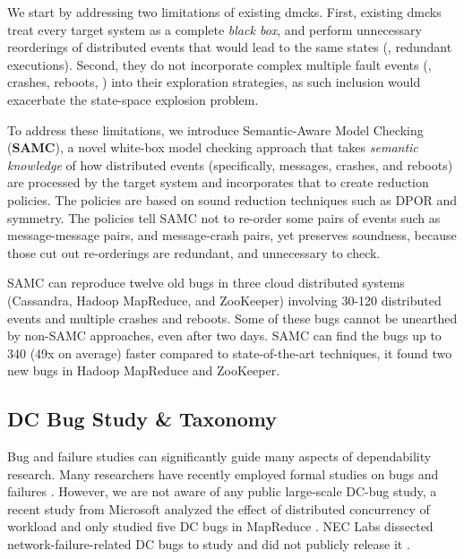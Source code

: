 We start by addressing two limitations of existing dmcks. First, existing dmcks
treat every target system as a complete \textit{black box}, and perform
unnecessary reorderings of distributed events that would lead to the same states
(\ie, redundant executions). Second, they do not incorporate complex multiple
fault events (\eg, crashes, reboots, \etc) into their exploration strategies, as
such inclusion would exacerbate the state-space explosion problem.

To address these limitations, we introduce Semantic-Aware Model Checking
(\textbf{SAMC}), a novel white-box model checking approach that takes
\textit{semantic knowledge} of how distributed events (specifically, messages,
crashes, and reboots) are processed by the target system and incorporates that
to create reduction policies. The policies are based on sound reduction
techniques such as DPOR and symmetry. The policies tell SAMC not to re-order
some pairs of events such as message-message pairs, and message-crash pairs, yet
preserves soundness, because those cut out re-orderings are redundant, and
unnecessary to check.

SAMC can reproduce twelve old bugs in three cloud distributed systems
(Cassandra, Hadoop MapReduce, and ZooKeeper) involving 30-120 distributed events
and multiple crashes and reboots. Some of these bugs cannot be unearthed by
non-SAMC approaches, even after two days. SAMC can find the bugs up to 340 (49x
on average) faster compared to state-of-the-art techniques, it found two new
bugs in Hadoop MapReduce and ZooKeeper.

\subsection{DC Bug Study \& Taxonomy}

Bug and failure studies can significantly guide many aspects of dependability
research. Many researchers have recently employed formal studies on bugs and
failures \cite{Jin+12-PerformanceBugs, Li+13-ScopeBugStudy, Li+07-MemoryErrors,
Lu+08-ConcurrencyBugStudy, Sahoo+10-StudyBugsServerSoftware,
SridharanLiberty12-StudyDRAMFailures, Xiao+14-NonDetMR,
Yin+11-StudyConfErrors}.
%
However, we are not aware of any public large-scale DC-bug study, a recent
study from Microsoft analyzed the effect of distributed concurrency of workload
and only studied five DC bugs in MapReduce \cite{Xiao+14-NonDetMR}. NEC Labs
dissected network-failure-related DC bugs to study and did not publicly release
it \cite{Joshi+13-SetsudoTesting}.

